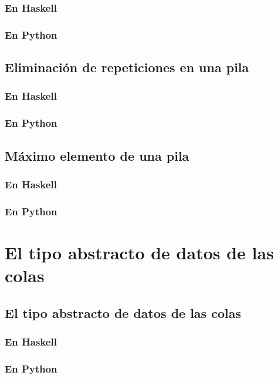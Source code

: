 \documentclass[a4paper,12pt,twoside]{book}
\begin{document}
\subsection{En Haskell}
\subsection{En Python}

\section{Eliminación de repeticiones en una pila}
\subsection{En Haskell}
\subsection{En Python}

\section{Máximo elemento de una pila}
\subsection{En Haskell}
\subsection{En Python}

\chapter{El tipo abstracto de datos de las colas}

\minitoc

\section{El tipo abstracto de datos de las colas}
\subsection{En Haskell}
\subsection{En Python}
\end{document}
